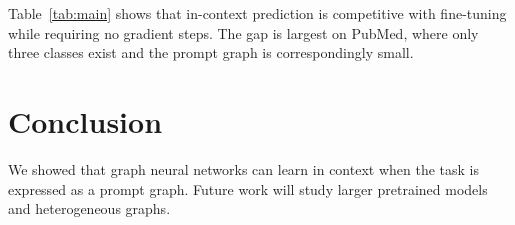 \documentclass[11pt]{article}
\begin{document}
Table~\ref{tab:main} shows that in-context prediction is competitive with fine-tuning while requiring no gradient steps. The gap is largest on PubMed, where only three classes exist and the prompt graph is correspondingly small.


\section{Conclusion}
We showed that graph neural networks can learn in context when the task is expressed as a prompt graph. Future work will study larger pretrained models and heterogeneous graphs.



\end{document}
